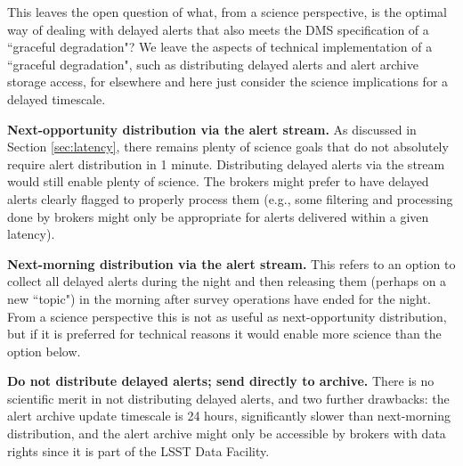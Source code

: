 \documentclass[DM,lsstdraft,authoryear,toc]{lsstdoc}
\begin{document}
This leaves the open question of what, from a science perspective, is the optimal way of dealing with delayed alerts that also meets the DMS specification of a ``graceful degradation"?
We leave the aspects of technical implementation of a ``graceful degradation", such as distributing delayed alerts and alert archive storage access, for elsewhere and here just consider the science implications for a delayed timescale.

{\bf Next-opportunity distribution via the alert stream.} As discussed in Section \ref{sec:latency}, there remains plenty of science goals that do not absolutely require alert distribution in 1 minute.
Distributing delayed alerts via the stream would still enable plenty of science.
The brokers might prefer to have delayed alerts clearly flagged to properly process them (e.g., some filtering and processing done by brokers might only be appropriate for alerts delivered within a given latency).

{\bf Next-morning distribution via the alert stream.} This refers to an option to collect all delayed alerts during the night and then releasing them (perhaps on a new ``topic") in the morning after survey operations have ended for the night.
From a science perspective this is not as useful as next-opportunity distribution, but if it is preferred for technical reasons it would enable more science than the option below.

{\bf Do not distribute delayed alerts; send directly to archive.} There is no scientific merit in not distributing delayed alerts, and two further drawbacks: the alert archive update timescale is 24 hours, significantly slower than next-morning distribution, and the alert archive might only be accessible by brokers with data rights since it is part of the LSST Data Facility.





\end{document}
